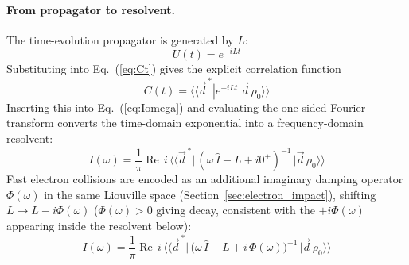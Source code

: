 \documentclass[11pt,a4paper]{article}
\numberwithin{equation}{section}
\begin{document}
\paragraph{From propagator to resolvent.}
The time-evolution propagator is generated by $L$:
\begin{equation}
\label{eq:propagator}
U(t) = e^{-iLt}
\end{equation}
Substituting into Eq.~(\ref{eq:Ct}) gives the explicit correlation function
\begin{equation}
\label{eq:Ct_explicit}
C(t) = \langle\langle \vec{d}^{\,*} | e^{-iLt} | \vec{d}\,\rho_0 \rangle\rangle
\end{equation}
Inserting this into Eq.~(\ref{eq:Iomega}) and evaluating the one-sided Fourier transform converts the time-domain exponential into a frequency-domain resolvent:
\begin{equation}
\label{eq:resolvent_bare}
I(\omega) = \frac{1}{\pi}\operatorname{Re}\,
  i\,\langle\langle \vec{d}^{\,*} \big|\,(\omega\,\hat{I} - L + i0^+)^{-1}\,\big| \vec{d}\,\rho_0 \rangle\rangle
\end{equation}
Fast electron collisions are encoded as an additional imaginary damping operator
$\Phi(\omega)$ in the same Liouville space (Section~\ref{sec:electron_impact}), shifting
$L \to L - i\Phi(\omega)$ ($\Phi(\omega)>0$ giving decay, consistent with the $+i\Phi(\omega)$
appearing inside the resolvent below):
\begin{equation}
\label{eq:resolvent_broadened}
I(\omega) = \frac{1}{\pi}\operatorname{Re}\,
  i\,\langle\langle \vec{d}^{\,*} \big|\,
  \bigl(\omega\,\hat{I} - L + i\,\Phi(\omega)\bigr)^{-1}
  \,\big| \vec{d}\,\rho_0 \rangle\rangle
\end{equation}
\end{document}
